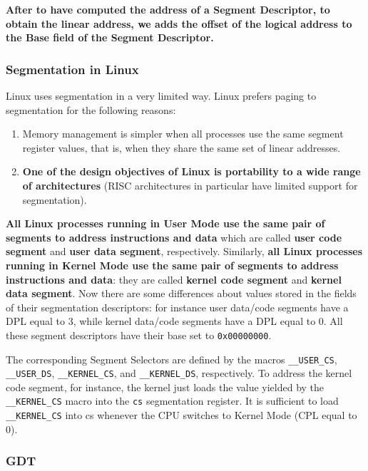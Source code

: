 \documentclass[10pt,a4paper]{article}
\begin{document}
\textbf{After to have computed the address of a Segment Descriptor, to obtain the linear address, we adds the offset of the logical address to the Base field of the Segment Descriptor.}

\subsubsection{Segmentation in Linux}

Linux uses segmentation in a very limited way. Linux prefers paging to segmentation for the following reasons:
\begin{enumerate}
\item Memory management is simpler when all processes use the same segment register values, that is, when they share the same set of linear addresses.
\item \textbf{One of the design objectives of Linux is portability to a wide range of architectures} (RISC architectures in particular have limited support for segmentation).
\end{enumerate}



 \textbf{All Linux processes running in User Mode use the same pair of segments to address instructions and data} which are called \textbf{user code segment} and \textbf{user data segment}, respectively. Similarly, \textbf{all Linux processes running in Kernel Mode use the same pair of segments to address instructions and data}: they are called \textbf{kernel code segment} and \textbf{kernel data segment}. Now there are some differences about values stored in the fields of their segmentation descriptors: for instance user data/code segments have a DPL equal to 3, while kernel data/code segments have a DPL equal to 0. All these segment descriptors have their base set to \texttt{0x00000000}. 

The corresponding Segment Selectors are defined by the macros \texttt{\_\_USER\_CS}, \texttt{\_\_USER\_DS}, \texttt{\_\_KERNEL\_CS}, and \texttt{\_\_KERNEL\_DS}, respectively. To address the kernel code segment, for instance, the kernel just loads the value yielded by the \texttt{\_\_KERNEL\_CS} macro into the \texttt{cs} segmentation register. It is sufficient to load \texttt{\_\_KERNEL\_CS} into cs whenever the CPU switches to Kernel Mode (CPL equal to 0).

\subsubsection{GDT}
\end{document}
